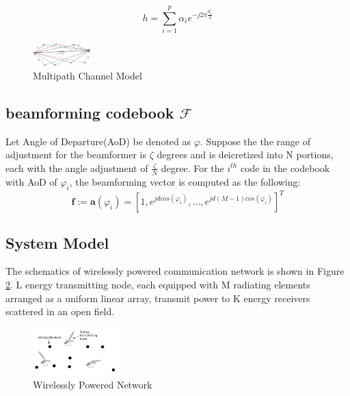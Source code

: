 \begin{equation}
h=\sum_{i=1}^p \alpha_i e^{-j2\pi \frac{d_i}{\lambda}}
\end{equation}

\begin{figure}[H]
\centering
\includegraphics[width=0.2\textwidth]{channel.png}
\caption{Multipath Channel Model}
\label{fig:channel}
\end{figure}


\subsection{beamforming codebook $\mathcal{F}$}

Let Angle of Departure(AoD) be denoted as $\varphi$. Suppose the the range of adjustment for the beamformer is $\zeta$ degrees and is deicretized into N portions, each with the angle adjustment of $\frac{\zeta}{N}$ degree. For the $i^{th}$ code in the codebook with AoD of $\varphi_i$, the beamforming vector is computed as the following:
\begin{equation}
\textbf{f} := \textbf{a}(\varphi_i)= [1,e^{jdcos(\varphi_i)},...,e^{jd(M-1)cos(\varphi_i)}]^T
\end{equation}

\subsection{System Model}

The schematics of wirelessly powered communication network is shown in Figure \ref{fig:MIMO}. L energy transmitting node, each equipped with M radiating elements arranged as a uniform linear array, transmit power to K energy receivers scattered in an open field.

\begin{figure}[H]
    \centering
    \includegraphics[width=0.3\textwidth]{6.png}
    \caption{Wirelessly Powered Network}
    \label{fig:MIMO}
\end{figure}

